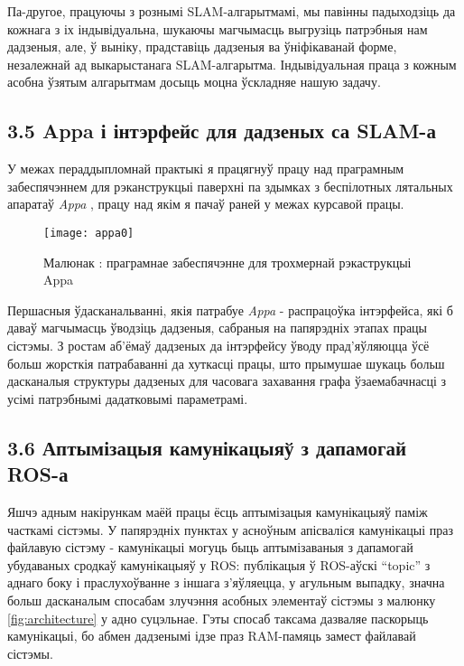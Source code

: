 Па-другое, працуючы з рознымі SLAM-алгарытмамі, мы павінны падыходзіць да кожнага з іх
індывідуальна, шукаючы магчымасць выгрузіць патрэбныя нам дадзеныя, але, ў выніку,
прадставіць дадзеныя ва ўніфікаванай форме, незалежнай ад выкарыстанага SLAM-алгарытма.
Індывідуальная праца з кожным асобна ўзятым алгарытмам досыць моцна ўскладняе нашую задачу.

\subsection*{3.5 Appa і інтэрфейс для дадзеных са SLAM-а}

У межах пераддыпломнай практыкі я працягнуў працу над праграмным забеспячэннем
для рэканструкцыі паверхні па здымках з беспілотных лятальных апаратаў \textit{Appa} \cite{appa-software},
працу над якім я пачаў раней у межах курсавой працы.

\begin{figure}[H]
  \centering
  \texttt{[image: appa0]}
  \captionsetup{labelformat=empty}
  \caption{Малюнак : праграмнае забеспячэнне для трохмернай рэкаструкцыі Appa}
  \label{fig:appa0}
\end{figure}

Першасныя ўдасканальванні, якія патрабуе \textit{Appa} - распрацоўка інтэрфейса, які б
даваў магчымасць ўводзіць дадзеныя, сабраныя на папярэдніх этапах працы сістэмы. З ростам аб'ёмаў
дадзеных да інтэрфейсу ўводу прад'яўляюцца ўсё больш жорсткія патрабаванні да хуткасці працы,
што прымушае шукаць больш дасканалыя структуры дадзеных для часовага захавання графа ўзаемабачнасці
з усімі патрэбнымі дадатковымі параметрамі.

\subsection*{3.6 Аптымізацыя камунікацыяў з дапамогай ROS-а}

Яшчэ адным накірункам маёй працы ёсць аптымізацыя камунікацыяў паміж часткамі
сістэмы. У папярэдніх пунктах у асноўным апісваліся камунікацыі праз файлавую сістэму - камунікацыі могуць быць
аптымізаваныя з дапамогай убудаваных сродкаў камунікацыяў у ROS: публікацыя ў ROS-аўскі
``topic'' з аднаго боку і праслухоўванне з іншага з'яўляецца, у агульным
выпадку, значна больш дасканалым спосабам злучэння асобных элементаў сістэмы з малюнку \ref{fig:architecture}
у адно суцэльнае. Гэты спосаб таксама дазваляе паскорыць камунікацыі,
бо абмен дадзенымі ідзе праз RAM-памяць замест файлавай сістэмы.

\newpage
